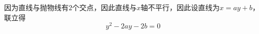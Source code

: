 因为直线与抛物线有$2$个交点，因此直线与$x$轴不平行，因此设直线为$x = ay + b$，联立得
\begin{equation}
{y^2} - 2ay - 2b = 0
\end{equation}